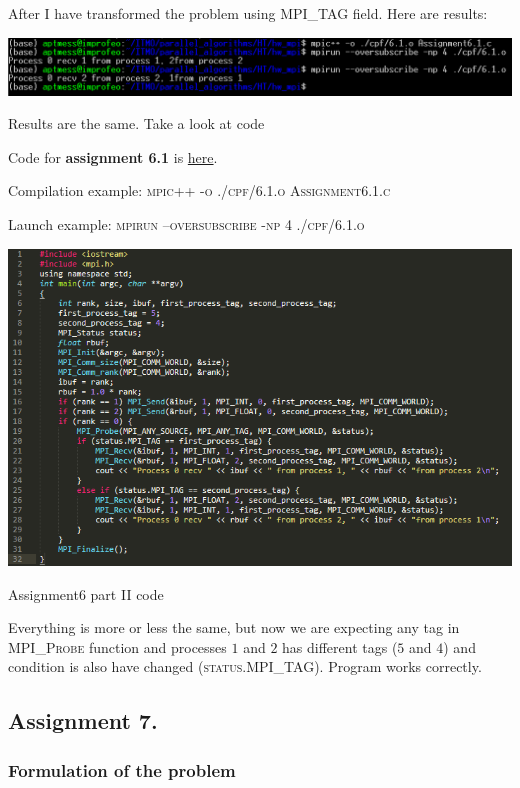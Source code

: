 \documentclass[%
12pt, %
final, %
oneside, %
onecolumn, %
centertags]{article} %
\theoremstyle{plain}
\theoremstyle{definition}
\theoremstyle{remark}
\begin{document}
After I have transformed the problem using \textsc{MPI\_TAG} field. Here are results:

\begin{center}
\includegraphics[scale=0.65]{6.2.png}

Results are the same. Take a look at code
\end{center}

Code for \textbf{assignment 6.1} is \href{https:\//github.com/aptmess/parallel_algorithms/blob/master/HT/hw_mpi/Assignment6.1.c}{here}.

Compilation example: \textsc{mpic++ -o ./cpf/6.1.o Assignment6.1.c}

Launch example: \textsc{mpirun --oversubscribe -np 4 ./cpf/6.1.o}

\begin{center}
\includegraphics[scale=0.7]{6.2.code.png}

Assignment6 part II code
\end{center}

Everything is more or less the same, but now we are expecting any tag in \textsc{MPI\_Probe} function and processes $1$ and $2$ has different tags ($5$ and $4$) and condition is also have changed (\textsc{status.MPI\_TAG}). Program works correctly.


\newpage
\subsection{Assignment 7.}

\subsubsection{Formulation of the problem}
\end{document}
